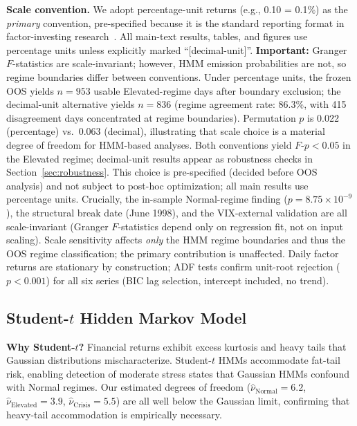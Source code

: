 \documentclass[sigconf,anonymous]{acmart}
\begin{document}
\textbf{Scale convention.} We adopt percentage-unit returns (e.g., 0.10 = 0.1\%) as the
\emph{primary} convention, pre-specified because it is the standard reporting
format in factor-investing research~\cite{fama2015five,ehsani2022factor}.
All main-text results, tables, and figures use
percentage units unless explicitly marked ``[decimal-unit]''.
\textbf{Important:} Granger $F$-statistics are scale-invariant; however,
HMM emission probabilities are not,
so regime boundaries differ between conventions. Under percentage units,
the frozen OOS yields $n = 953$ usable Elevated-regime days after boundary exclusion;
the decimal-unit alternative yields $n = 836$
(regime agreement rate: 86.3\%, with 415 disagreement days concentrated at regime
boundaries). Permutation $p$ is 0.022 (percentage) vs.\ 0.063 (decimal),
illustrating that scale choice is a material degree of freedom for
HMM-based analyses. Both conventions yield $F$-$p < 0.05$ in the Elevated
regime; decimal-unit results appear as robustness checks in
Section~\ref{sec:robustness}.
This choice is pre-specified (decided before OOS analysis) and not subject
to post-hoc optimization; all main results use percentage units.
Crucially, the in-sample Normal-regime finding ($p = 8.75 \times 10^{-9}$),
the structural break date (June 1998), and the VIX-external validation
are all scale-invariant (Granger $F$-statistics depend only on regression
fit, not on input scaling). Scale sensitivity affects \emph{only} the HMM
regime boundaries and thus the OOS regime classification; the primary
contribution is unaffected.
Daily factor returns are stationary by construction; ADF tests confirm unit-root
rejection ($p < 0.001$) for all six series (BIC lag selection, intercept included,
no trend).

\subsection{Student-\texorpdfstring{$t$}{t} Hidden Markov Model}

\textbf{Why Student-$t$?} Financial returns exhibit excess kurtosis
and heavy tails that Gaussian distributions mischaracterize.
Student-$t$ HMMs accommodate fat-tail risk, enabling detection of
moderate stress states that Gaussian HMMs confound with Normal regimes.
Our estimated degrees of freedom ($\hat{\nu}_{\text{Normal}} = 6.2$,
$\hat{\nu}_{\text{Elevated}} = 3.9$, $\hat{\nu}_{\text{Crisis}} = 5.5$)
are all well below the Gaussian limit, confirming that heavy-tail
accommodation is empirically necessary.
\end{document}
